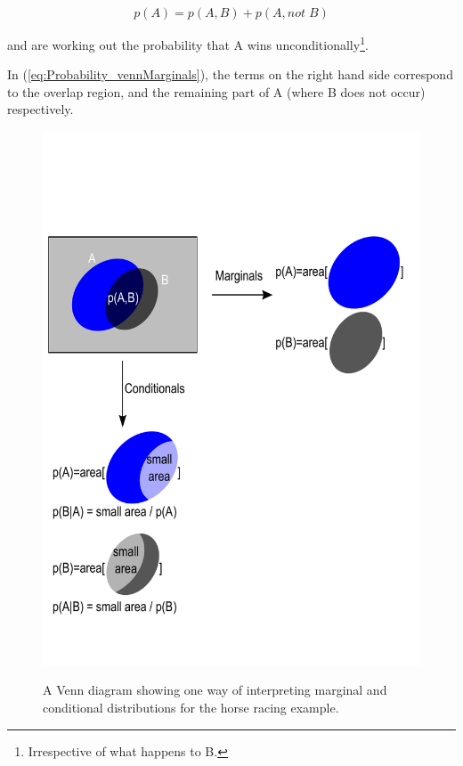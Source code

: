 \documentclass[11pt,fullpage]{book}
\begin{document}
\begin{equation}\label{eq:Probability_vennMarginals}
p(A) = p(A,B) + p(A,not\; B)
\end{equation}

and are working out the probability that A wins unconditionally\footnote{Irrespective of what happens to B.}.

In (\ref{eq:Probability_vennMarginals}), the terms on the right hand side correspond to the overlap region, and the remaining part of A (where B does not occur) respectively.

\begin{figure}
\centering
\scalebox{0.5} 
{\includegraphics{Probability_Venn.pdf}}
\caption{A Venn diagram showing one way of interpreting marginal and conditional distributions for the horse racing example.}\label{fig:Probability_Venn}
\end{figure}
\end{document}
